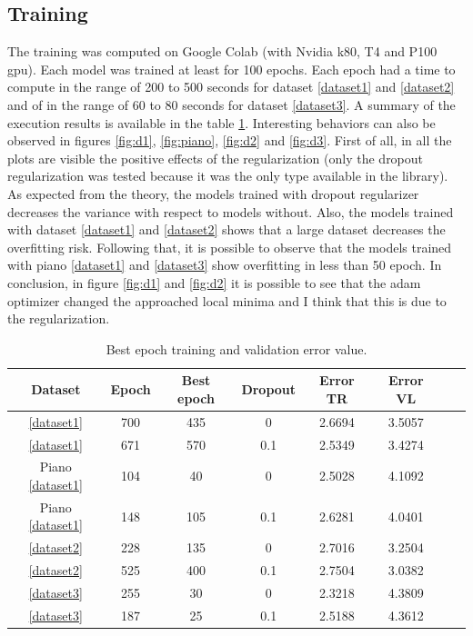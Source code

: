 \subsection{Training}
\label{training}
The training was computed on Google Colab (with Nvidia k80, T4 and P100 gpu). Each model was trained at least for 100 epochs. Each epoch had a time to compute in the range of 200 to 500 seconds for dataset \ref{dataset1} and \ref{dataset2} and of in the range of 60 to 80 seconds for dataset \ref{dataset3}.
A summary of the execution results is available in the table \ref{tab:training_value}.
Interesting behaviors can also be observed in figures \ref{fig:d1}, \ref{fig:piano}, \ref{fig:d2} and \ref{fig:d3}.
First of all, in all the plots are visible the positive effects of the regularization (only the dropout regularization was tested because it was the only type available in the library). As expected from the theory, the models trained with dropout regularizer decreases the variance with respect to models without.
Also, the models trained with dataset \ref{dataset1} and \ref{dataset2} shows that a large dataset decreases the overfitting risk. Following that, it is possible to observe that the models trained with piano \ref{dataset1} and \ref{dataset3} show overfitting in less than 50 epoch.
In conclusion, in figure \ref{fig:d1} and \ref{fig:d2} it is possible to see that the adam optimizer changed the approached local minima and I think that this is due to the regularization. 
\begin{center}
	\small\addtolength{\tabcolsep}{-3pt}
	\begin{table}[h!]
		\centering
		\begin{tabular}{|c|c|c|c|c|c|c|c|}
			\hline
			\textbf{Dataset}& \textbf{Epoch} & \textbf{Best epoch} & \textbf{Dropout} & \textbf{Error TR} & \textbf{Error VL}\\ \hline
			\ref{dataset1} & 700 & 435 & 0 & 2.6694 & 3.5057 \\			\ref{dataset1} & 671 & 570 & 0.1 & 2.5349 & 3.4274 \\		 
			Piano \ref{dataset1} & 104 & 40 & 0 & 2.5028 & 4.1092 \\			
			Piano \ref{dataset1} & 148 & 105 & 0.1 & 2.6281 & 4.0401 \\			\ref{dataset2} & 228 & 135 & 0 & 2.7016 & 3.2504 \\			\ref{dataset2} & 525 & 400 & 0.1 & 2.7504 & 3.0382 \\			\ref{dataset3} & 255 & 30 & 0 & 2.3218 & 4.3809 \\			\ref{dataset3} & 187 & 25 & 0.1 & 2.5188 & 4.3612 \\
			\hline
		\end{tabular}
		\caption{Best epoch training and validation error value.}
		\label{tab:training_value}
	\end{table}
\end{center}


